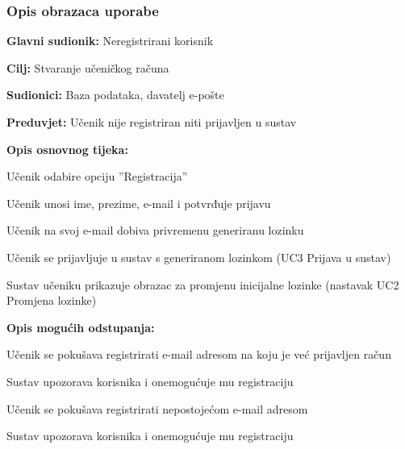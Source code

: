 \subsubsection{Opis obrazaca uporabe}


\noindent {}
\begin{packed_item}

	\item \textbf{Glavni sudionik:} Neregistrirani korisnik
	\item  \textbf{Cilj:} Stvaranje učeničkog računa
	\item  \textbf{Sudionici:} Baza podataka, davatelj e-pošte
	\item  \textbf{Preduvjet:} Učenik nije registriran niti prijavljen u sustav
	\item  \textbf{Opis osnovnog tijeka:}
	
	\item[] \begin{packed_enum}

		\item Učenik odabire opciju ”Registracija”
		\item Učenik unosi ime, prezime, e-mail i potvrđuje prijavu
		\item Učenik na svoj e-mail dobiva privremenu generiranu lozinku
		\item Učenik se prijavljuje u sustav s generiranom lozinkom (UC3 Prijava u sustav)							
		\item Sustav učeniku prikazuje obrazac za promjenu inicijalne lozinke (nastavak UC2 Promjena lozinke)
	\end{packed_enum}
	
	\item  \textbf{Opis mogućih odstupanja:}
	
	\item[] \begin{packed_item}

		\item[2.a]Učenik se pokušava registrirati e-mail adresom na koju je već prijavljen račun
		\item[] \begin{packed_enum}
			
			\item Sustav upozorava korisnika i onemogućuje mu registraciju							
		\end{packed_enum}

\item[2.b] Učenik se pokušava registrirati nepostojećom e-mail adresom
\item[] \begin{packed_enum}

\item Sustav upozorava korisnika i onemogućuje mu registraciju 								
\end{packed_enum}

\end{packed_item}
\end{packed_item}

